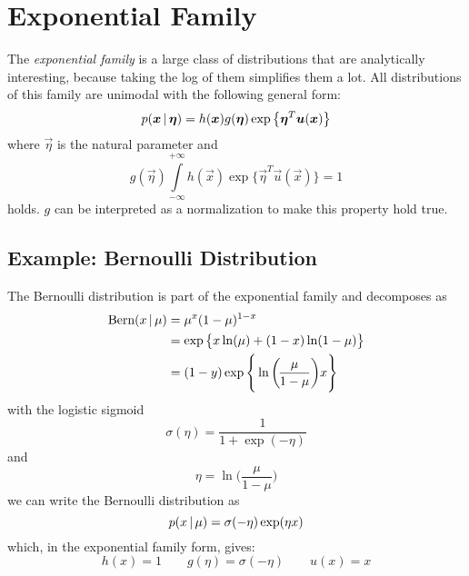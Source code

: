 	\section{Exponential Family}
		The \emph{exponential family} is a large class of distributions that are analytically interesting, because taking the log of them simplifies them a lot. All distributions of this family are unimodal with the following general form:
		\begin{equation}
			p(\bm{x} \,\vert\, \bm{\eta}) = h(\bm{x}) g(\bm{\eta}) \exp \big\{ \bm{\eta}^T \bm{u}(\bm{x}) \big\}
		\end{equation}
		where \(\vec{\eta}\) is the natural parameter and
		\begin{equation}
			g(\vec{\eta}) \int\limits_{-\infty}^{+\infty} h(\vec{x}) \exp \big\{ \vec{\eta}^T \vec{u}(\vec{x}) \big\} = 1
		\end{equation}
		holds. \(g\) can be interpreted as a normalization to make this property hold true.

		\subsection{Example: Bernoulli Distribution}
			The Bernoulli distribution is part of the exponential family and decomposes as
			\begin{align}
				\textrm{Bern}(x \,\vert\, \mu) & = \mu^x (1 - \mu)^{1 - x}                                              \\
				                            & = \exp \big\{ x \ln(\mu) + (1 - x) \ln(1 - \mu) \big\}                 \\
				                            & = (1 - y) \exp \Bigg\{ \ln\bigg(\!\frac{\mu}{1 - \mu} \bigg) x \Bigg\}
			\end{align}
			with the logistic sigmoid
			\begin{equation}
				\sigma(\eta) = \frac{1}{1 + \exp(-\eta)}
			\end{equation}
			and
			\begin{equation}
				\eta = \ln\bigg(\!\frac{\mu}{1 - \mu} \bigg)
			\end{equation}
			we can write the Bernoulli distribution as
			\begin{equation}
				p(x \,\vert\, \mu) = \sigma(-\eta) \exp(\eta x)
			\end{equation}
			which, in the exponential family form, gives:
			\begin{equation}
				h(x) = 1 \qquad g(\eta) = \sigma(-\eta) \qquad u(x) = x
			\end{equation}

